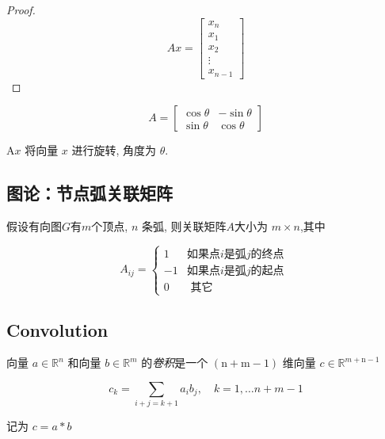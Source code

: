 \begin{proof}
    $$ A x=\left[\begin{array}{c}x_{n} \\ x_{1} \\ x_{2} \\ \vdots \\ x_{n-1}\end{array}\right] $$
\end{proof}

\begin{example}[旋转矩阵]
    $$ A=\left[\begin{array}{cc}\cos \theta & -\sin \theta \\ \sin \theta & \cos \theta\end{array}\right] $$

    $ \mathrm{A} x $ 将向量 $ x $ 进行旋转, 角度为 $ \theta $.
\end{example}

\subsection{图论：节点弧关联矩阵}

\begin{definition}[关联矩阵]
   假设有向图$G$有$m$个顶点,  $ n $ 条弧, 则关联矩阵$A$大小为 $ m \times n $,其中 

   $$ A_{i j}=\left\{\begin{array}{ll}1 & \text{如果点} i \text{是弧} j \text{的终点 } \\ -1 & \text {如果点}i \text{是弧}j \text{的起点} \\ 0 & \text { 其它 }\end{array}\right. $$
\end{definition}

\subsection{Convolution}

\begin{definition}[一维卷积]
    向量 $ a \in \mathbb{R}^{n} $ 和向量 $ b \in \mathbb{R}^{m} $ 的\textit{卷积}是一个 $ (\mathrm{n}+\mathrm{m}-1) $ 维向量 $ c \in \mathbb{R}^{m+\mathrm{n}-1} $

    $$ c_{k}=\sum_{i+j=k+1} a_{i} b_{j}, \quad k=1, \ldots n+m-1 $$

    记为 $ c=a * b$
\end{definition}

